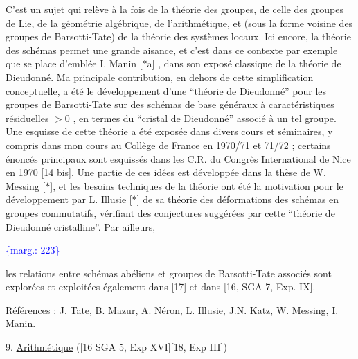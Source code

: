 \documentclass[11pt]{article}
\newcommand{\scanpage}[1]{\par\bigskip\noindent{\small\sffamily[scan #1]}\par}
\newcommand{\mspage}[1]{{\small\sffamily[p.\,#1]}}
\newcommand{\margin}[1]{\textcolor{blue}{\{\textsf{marg.:} #1\}}}
\newcommand{\uline}[1]{\underline{#1}}
\begin{document}
C'est un sujet qui relève à la fois de la
théorie des groupes, de celle des groupes de Lie, de
la géométrie algébrique, de l'arithmétique, et (sous
la forme voisine des groupes de Barsotti-Tate) de la
théorie des systèmes locaux. Ici encore, la théorie
des schémas permet une grande aisance, et c'est dans
ce contexte par exemple que se place d'emblée I. Manin
[$*$a] , dans son exposé classique de la théorie de
Dieudonné. Ma principale contribution, en dehors de
cette simplification conceptuelle, a été le développement
d'une ``théorie de Dieudonné'' pour les groupes de
Barsotti-Tate sur des schémas de base généraux à
caractéristiques résiduelles $> 0$ , en termes du
``cristal de Dieudonné'' associé à un tel groupe. Une
esquisse de cette théorie a été exposée dans divers
cours et séminaires, y compris dans mon cours au
Collège de France en 1970/71 et 71/72 ; certains énoncés
principaux sont esquissés dans les C.R. du Congrès
International de Nice en 1970 [14 bis]. Une partie
de ces idées est développée dans la thèse de W. Messing
[$*$], et les besoins techniques de la théorie ont été
la motivation pour le développement par L. Illusie [$*$]
de sa théorie des déformations des schémas en groupes
commutatifs, vérifiant des conjectures suggérées par
cette ``théorie de Dieudonné cristalline''. Par ailleurs,

\margin{223}

\clearpage
\scanpage{119/224}
\mspage{. 11 .}

les relations entre schémas abéliens et groupes de
Barsotti-Tate associés sont explorées et exploitées
également dans [17] et dans [16, SGA 7, Exp. IX].

\uline{Références} : J. Tate, B. Mazur, A. Néron, L. Illusie,
J.N. Katz, W. Messing, I. Manin.

9. \uline{Arithmétique} ([16 SGA 5, Exp XVI][18, Exp III])
\end{document}
